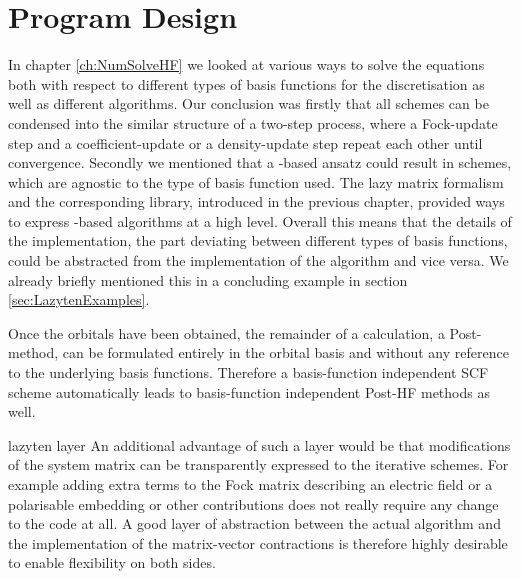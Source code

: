  \section{Program Design}
\label{sec:MolsturmDesign}

In chapter \vref{ch:NumSolveHF} we looked at various ways to solve the
\HF equations both with respect to different types of basis functions
for the discretisation as well as different \SCF algorithms.
Our conclusion was firstly that all \SCF schemes can be
condensed into the similar structure of a two-step process,
where a Fock-update step and a coefficient-update or a density-update step
repeat each other until convergence.
Secondly we mentioned that a \contraction-based ansatz could result in \SCF schemes,
which are agnostic to the type of basis function used.
The lazy matrix formalism and the corresponding \lazyten library,
introduced in the previous chapter,
provided ways to express \contraction-based algorithms at a high level.
Overall this means that the details of the \contraction implementation,
\ie the part deviating between different types of basis functions,
could be abstracted from the implementation of the \SCF algorithm
and vice versa.
We already briefly mentioned this in a concluding example
in section \vref{sec:LazytenExamples}.

Once the \SCF orbitals have been obtained,
the remainder of a calculation, \eg a Post-\HF method,
can be formulated entirely in the \SCF orbital basis
and without any reference to the underlying basis functions.
Therefore a basis-function independent SCF scheme automatically
leads to basis-function independent Post-HF methods as well.

lazyten layer
An additional advantage of such a layer would be that
modifications of the system matrix can be transparently expressed
to the iterative schemes.
For example adding extra terms to the Fock matrix
describing an electric field or a polarisable embedding
or other contributions does not really require
any change to the \SCF code at all.
A good layer of abstraction between the actual \SCF algorithm
and the implementation of the matrix-vector contractions
is therefore highly desirable to enable flexibility on both sides.

